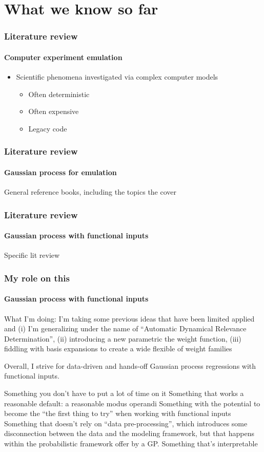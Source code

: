 \documentclass{snedecorbeamer}
\begin{document}
\section{What we know so far}

\begin{frame}
  \frametitle{Literature review}
  \framesubtitle{Computer experiment emulation}

  \begin{itemize}
  \item Scientific phenomena investigated via complex computer models
    \begin{itemize}
    \item Often deterministic
    \item Often expensive
    \item Legacy code
    \end{itemize}
  \end{itemize}

\end{frame}

\begin{frame}
  \frametitle{Literature review}
  \framesubtitle{Gaussian process for emulation}

  General reference books, including the topics the cover
\end{frame}

\begin{frame}
  \frametitle{Literature review}
  \framesubtitle{Gaussian process with functional inputs}

  Specific lit review
\end{frame}

\begin{frame}
  \frametitle{My role on this}
  \framesubtitle{Gaussian process with functional inputs}

  What I'm doing: I'm taking some previous ideas that have been limited applied
  and (i) I'm generalizing under the name of ``Automatic Dynamical Relevance
  Determination'', (ii) introducing a new parametric the weight function,
  (iii) fiddling with basis expansions to create a wide flexible of weight
  families

  Overall, I strive for data-driven and hands-off Gaussian process regressions
  with functional inputs.

  Something you don't have to put a lot of time on it
  Something that works a reasonable default: a reasonable modus operandi
  Something with the potential to become the ``the first thing to try'' when
  working with functional inputs
  Something that doesn't rely on ``data pre-processing'', which introduces some
disconnection between the data and the modeling framework, but that happens
within the probabilistic framework offer by a GP.
  Something that's interpretable
\end{frame}
\end{document}
